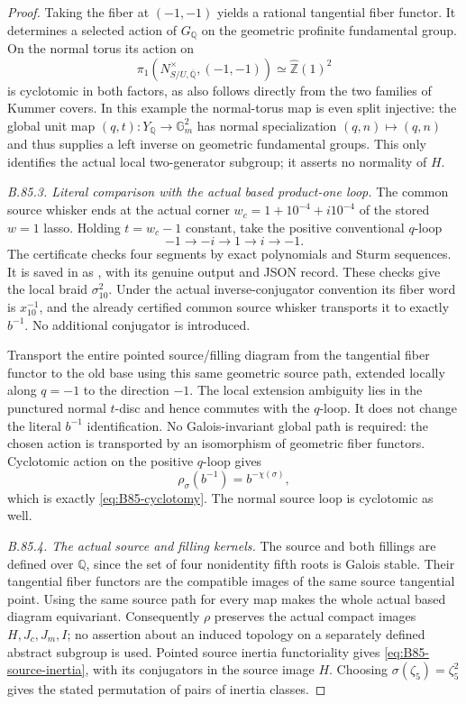 \begin{proof}
Taking the fiber at $(-1,-1)$ yields a rational tangential fiber functor.
It determines a selected action of $G_{\mathbb Q}$ on the geometric
profinite fundamental group. On the normal torus its action on
\[
 \pi _1(N^\times_{S/U,\overline{\mathbb Q}},(-1,-1))
       \simeq\widehat{\mathbb Z}(1)^2
\]
is cyclotomic in both factors, as also follows directly from the two
families of Kummer covers. In this example the normal-torus map is even
split injective: the global unit map $(q,t):Y_{\mathbb Q}\to\mathbb G_m^2$ has
normal specialization $(q,n)\mapsto(q,n)$ and thus supplies a left inverse
on geometric fundamental groups. This only identifies the actual local
two-generator subgroup; it asserts no normality of $H$.

\emph{B.85.3. Literal comparison with the actual based product-one loop.}
The common source whisker ends at the actual corner
$w_c=1+10^{-4}+i10^{-4}$ of the stored $w=1$ lasso. Holding $t=w_c-1$
constant, take the positive conventional $q$-loop
\[
 -1\longrightarrow-i\longrightarrow1\longrightarrow i\longrightarrow-1.
\]
The certificate checks four segments by exact polynomials and Sturm sequences.
It is saved in
 as
, with its genuine output and JSON
record. These checks give the local braid $\sigma_{10}^2$.
Under the actual inverse-conjugator convention its fiber word is
$x_{10}^{-1}$, and the already certified common source whisker transports
it to exactly $b^{-1}$. No additional conjugator is introduced.

Transport the entire pointed source/filling diagram from the tangential
fiber functor to the old base using this same geometric source path,
extended locally along $q=-1$ to the direction $-1$. The local extension
ambiguity lies in the punctured normal $t$-disc and hence commutes with
the $q$-loop. It does not change the literal $b^{-1}$ identification.
No Galois-invariant global path is required: the chosen action is transported
by an isomorphism of geometric fiber functors. Cyclotomic action on the
positive $q$-loop gives
\[
 \rho_\sigma(b^{-1})=b^{-\chi(\sigma)},
\]
which is exactly \eqref{eq:B85-cyclotomy}. The normal source loop is
cyclotomic as well.

\emph{B.85.4. The actual source and filling kernels.}
The source and both fillings are defined over $\mathbb Q$, since the set
of four nonidentity fifth roots is Galois stable. Their tangential fiber
functors are the compatible images of the same source tangential point.
Using the same source path for every map makes the whole actual based
diagram equivariant. Consequently $\rho$ preserves the actual compact
images $H,J_c,J_m,I$; no assertion about an induced topology on a
separately defined abstract subgroup is used. Pointed source inertia
functoriality gives \eqref{eq:B85-source-inertia}, with its conjugators
in the source image $H$. Choosing $\sigma(\zeta _5)=\zeta _5^2$ gives
the stated permutation of pairs of inertia classes.


\end{proof}
